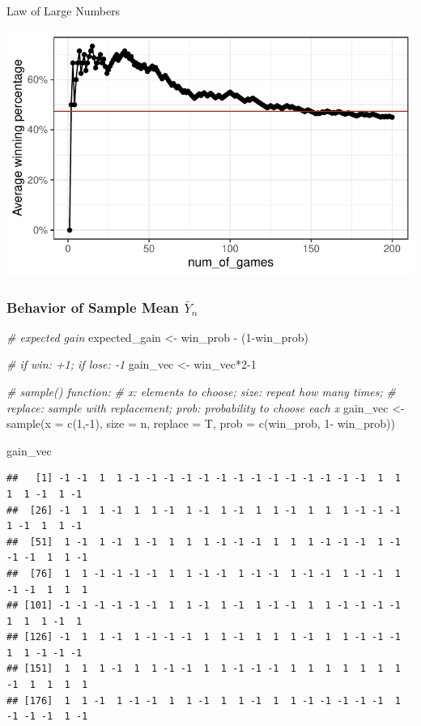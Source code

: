 \documentclass[
  ignorenonframetext,
]{beamer}
\newenvironment{Shaded}{\begin{snugshade}}{\end{snugshade}}
\newcommand{\AttributeTok}[1]{\textcolor[rgb]{0.77,0.63,0.00}{#1}}
\newcommand{\CommentTok}[1]{\textcolor[rgb]{0.56,0.35,0.01}{\textit{#1}}}
\newcommand{\DecValTok}[1]{\textcolor[rgb]{0.00,0.00,0.81}{#1}}
\newcommand{\FunctionTok}[1]{\textcolor[rgb]{0.00,0.00,0.00}{#1}}
\newcommand{\NormalTok}[1]{#1}
\newcommand{\OtherTok}[1]{\textcolor[rgb]{0.56,0.35,0.01}{#1}}
\newcommand{\SpecialCharTok}[1]{\textcolor[rgb]{0.00,0.00,0.00}{#1}}
\begin{document}
\begin{frame}[fragile]{Law of Large Numbers}
\begin{center}\includegraphics[width=0.7\linewidth]{Probability_Statistics_101_v2_files/figure-beamer/unnamed-chunk-2-1} \end{center}
\end{frame}

\begin{frame}[fragile]
\frametitle{Behavior of Sample Mean $\bar{Y}_{n}$}
\scriptsize

\begin{Shaded}
\begin{Highlighting}[]
\CommentTok{\# expected gain}
\NormalTok{expected\_gain }\OtherTok{\textless{}{-}}\NormalTok{ win\_prob }\SpecialCharTok{{-}}\NormalTok{ (}\DecValTok{1}\SpecialCharTok{{-}}\NormalTok{win\_prob)}

\CommentTok{\# if win: +1; if lose: {-}1}
\NormalTok{gain\_vec }\OtherTok{\textless{}{-}}\NormalTok{ win\_vec}\SpecialCharTok{*}\DecValTok{2{-}1}

\CommentTok{\# sample() function:}
\CommentTok{\# x: elements to choose; size: repeat how many times; }
\CommentTok{\# replace: sample with replacement; prob: probability to choose each x}
\NormalTok{gain\_vec }\OtherTok{\textless{}{-}} \FunctionTok{sample}\NormalTok{(}\AttributeTok{x =} \FunctionTok{c}\NormalTok{(}\DecValTok{1}\NormalTok{,}\SpecialCharTok{{-}}\DecValTok{1}\NormalTok{), }
                 \AttributeTok{size =}\NormalTok{ n,}
                 \AttributeTok{replace =}\NormalTok{ T, }
                 \AttributeTok{prob =} \FunctionTok{c}\NormalTok{(win\_prob, }\DecValTok{1}\SpecialCharTok{{-}}\NormalTok{ win\_prob))}

\NormalTok{gain\_vec}
\end{Highlighting}
\end{Shaded}

\begin{verbatim}
##   [1] -1 -1  1  1 -1 -1 -1 -1 -1 -1 -1 -1 -1 -1 -1 -1 -1 -1  1  1  1  1 -1  1 -1
##  [26] -1  1  1 -1  1  1 -1  1 -1  1 -1  1  1 -1  1  1  1 -1 -1 -1  1 -1  1  1 -1
##  [51]  1 -1  1 -1  1 -1  1  1  1 -1 -1 -1  1  1  1 -1 -1 -1  1 -1 -1 -1  1  1 -1
##  [76]  1  1 -1 -1 -1 -1  1  1 -1 -1  1 -1 -1  1 -1 -1  1 -1 -1  1 -1 -1  1  1  1
## [101] -1 -1 -1 -1 -1 -1  1  1 -1  1 -1  1 -1 -1  1  1 -1 -1 -1 -1  1  1  1 -1  1
## [126] -1  1  1 -1  1 -1 -1 -1  1  1 -1  1  1  1 -1  1  1 -1 -1 -1  1  1 -1 -1 -1
## [151]  1  1  1 -1  1  1 -1 -1  1  1 -1 -1 -1  1  1  1  1  1  1  1 -1  1  1  1  1
## [176]  1  1 -1  1 -1 -1  1  1 -1  1  1 -1  1  1 -1 -1 -1 -1 -1  1 -1 -1 -1  1 -1
\end{verbatim}
\end{frame}
\end{document}
